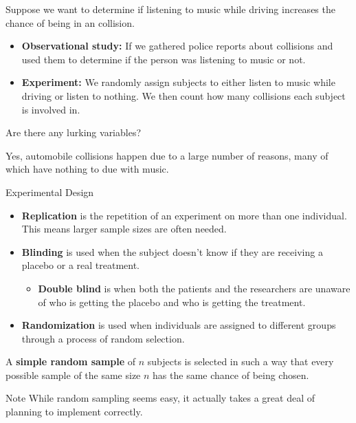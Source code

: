 \documentclass{beamer}
\begin{document}
\begin{frame}
\begin{example}
Suppose we want to determine if listening to music while driving increases the chance of being in an collision.\pause
\begin{itemize}
\item \textbf{Observational study:} If we gathered police reports about collisions and used them to determine if the person was listening to music or not.\pause
\item \textbf{Experiment:} We randomly assign subjects to either listen to music while driving or listen to nothing. We then count how many collisions each subject is involved in.\pause
\end{itemize}

Are there any lurking variables?\pause

Yes, automobile collisions happen due to a large number of reasons, many of which have nothing to due with music.
\end{example}
\end{frame}

\begin{frame}
\begin{block}{Experimental Design}
\begin{itemize}
\item \textbf{Replication} is the repetition of an experiment on more than one individual. This means larger sample sizes are often needed.\pause
\item \textbf{Blinding} is used when the subject doesn't know if they are receiving a placebo or a real treatment.\pause
\begin{itemize}
\item \textbf{Double blind} is when both the patients and the researchers are unaware of who is getting the placebo and who is getting the treatment.
\end{itemize}\pause
\item \textbf{Randomization} is used when individuals are assigned to different groups  through a process of random selection.
\end{itemize}
\end{block}\pause

\begin{definition}
A \textbf{simple random sample} of $n$ subjects is selected in such a way that every possible sample of the same size $n$ has the same chance of being chosen.
\end{definition}\pause

\begin{block}{Note}
While random sampling seems easy, it actually takes a great deal of planning to implement correctly.
\end{block}
\end{frame}
\end{document}
